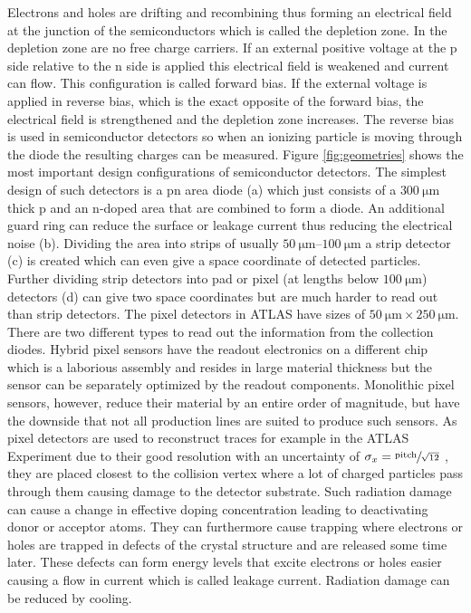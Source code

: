 Electrons and holes are drifting and recombining thus forming an electrical field at the junction of the semiconductors which is called the depletion zone.
In the depletion zone are no free charge carriers.
If an external positive voltage at the p side relative to the n side is applied this electrical field is weakened and current can flow.
This configuration is called forward bias.
If the external voltage is applied in reverse bias, which is the exact opposite of the forward bias, the electrical field is strengthened and the depletion zone increases.
The reverse bias is used in semiconductor detectors so when an ionizing particle is moving through the diode the resulting charges can be measured.
Figure \ref{fig:geometries} shows the most important design configurations of semiconductor detectors.
The simplest design of such detectors is a pn area diode (a) which just consists of a $\SI{300}{\micro\meter}$ thick p and an n-doped area that are combined to form a diode.
An additional guard ring can reduce the surface or leakage current thus reducing the electrical noise (b).
Dividing the area into strips of usually $\SIrange{50}{100}{\micro\meter}$ a strip detector (c) is created which can even give a space coordinate of detected particles.
Further dividing strip detectors into pad or pixel (at lengths below $\SI{100}{\micro\meter}$) detectors (d) can give two space coordinates but are much harder to read out than strip detectors.
The pixel detectors in ATLAS have sizes of $\SI{50}{\micro\meter}\times\SI{250}{\micro\meter}$.
There are two different types to read out the information from the collection diodes.
Hybrid pixel sensors have the readout electronics on a different chip which is a laborious assembly and resides in large material thickness but the sensor can be separately optimized by the readout components.
Monolithic pixel sensors, however, reduce their material by an entire order of magnitude, but have the downside that not all production lines are suited to produce such sensors.
As pixel detectors are used to reconstruct traces for example in the ATLAS Experiment due to their good resolution with an uncertainty of $\sigma_x=\sfrac{\text{pitch}}{\sqrt{12}}$ \cite{Tom}, they are placed closest to the collision vertex where a lot of charged particles pass through them causing damage to the detector substrate.
Such radiation damage can cause a change in effective doping concentration leading to deactivating donor or acceptor atoms.
They can furthermore cause trapping where electrons or holes are trapped in defects of the crystal structure and are released some time later.
These defects can form energy levels that excite electrons or holes easier causing a flow in current which is called leakage current.
Radiation damage can be reduced by cooling.

